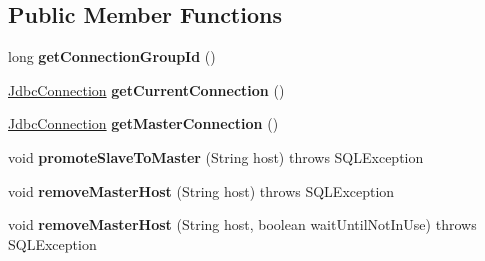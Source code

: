 \subsection*{Public Member Functions}
\begin{DoxyCompactItemize}
\item 
\mbox{\label{interfacecom_1_1mysql_1_1cj_1_1jdbc_1_1ha_1_1_replication_connection_a5010d921918f0ed6d8776fe44541a37c}} 
long {\bfseries get\+Connection\+Group\+Id} ()
\item 
\mbox{\label{interfacecom_1_1mysql_1_1cj_1_1jdbc_1_1ha_1_1_replication_connection_a0bfb42722305b18722f782067f85d538}} 
\mbox{\hyperlink{interfacecom_1_1mysql_1_1cj_1_1jdbc_1_1_jdbc_connection}{Jdbc\+Connection}} {\bfseries get\+Current\+Connection} ()
\item 
\mbox{\label{interfacecom_1_1mysql_1_1cj_1_1jdbc_1_1ha_1_1_replication_connection_ac4c0ab9593304c8a6928e376ac5d78d8}} 
\mbox{\hyperlink{interfacecom_1_1mysql_1_1cj_1_1jdbc_1_1_jdbc_connection}{Jdbc\+Connection}} {\bfseries get\+Master\+Connection} ()
\item 
\mbox{\label{interfacecom_1_1mysql_1_1cj_1_1jdbc_1_1ha_1_1_replication_connection_abeccff634ae5dc9f96295b012c458500}} 
void {\bfseries promote\+Slave\+To\+Master} (String host)  throws S\+Q\+L\+Exception
\item 
\mbox{\label{interfacecom_1_1mysql_1_1cj_1_1jdbc_1_1ha_1_1_replication_connection_a7e1cf8606d5b42c57ce5dfae63d981e3}} 
void {\bfseries remove\+Master\+Host} (String host)  throws S\+Q\+L\+Exception
\item 
\mbox{\label{interfacecom_1_1mysql_1_1cj_1_1jdbc_1_1ha_1_1_replication_connection_a47341136bcee35fd889a2d568e375756}} 
void {\bfseries remove\+Master\+Host} (String host, boolean wait\+Until\+Not\+In\+Use)  throws S\+Q\+L\+Exception
\item 
\mbox{\label{interfacecom_1_1mysql_1_1cj_1_1jdbc_1_1ha_1_1_replication_connection_a4b69699e70dfff96adec746e2c6e7254}} 

\end{DoxyCompactItemize}
